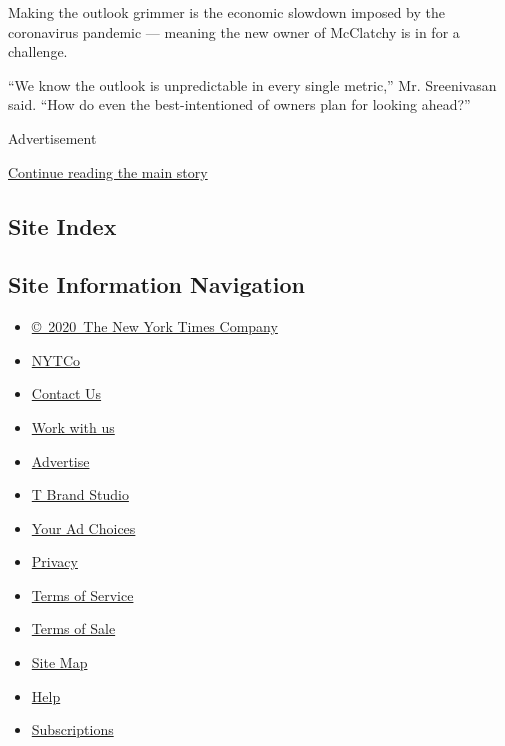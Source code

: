 Making the outlook grimmer is the economic slowdown imposed by the
coronavirus pandemic --- meaning the new owner of McClatchy is in for a
challenge.

``We know the outlook is unpredictable in every single metric,'' Mr.
Sreenivasan said. ``How do even the best-intentioned of owners plan for
looking ahead?''

Advertisement

\protect\hyperlink{after-bottom}{Continue reading the main story}

\hypertarget{site-index}{%
\subsection{Site Index}\label{site-index}}

\hypertarget{site-information-navigation}{%
\subsection{Site Information
Navigation}\label{site-information-navigation}}

\begin{itemize}
\tightlist
\item
  \href{https://help.nytimes.com/hc/en-us/articles/115014792127-Copyright-notice}{©~2020~The
  New York Times Company}
\end{itemize}

\begin{itemize}
\tightlist
\item
  \href{https://www.nytco.com/}{NYTCo}
\item
  \href{https://help.nytimes.com/hc/en-us/articles/115015385887-Contact-Us}{Contact
  Us}
\item
  \href{https://www.nytco.com/careers/}{Work with us}
\item
  \href{https://nytmediakit.com/}{Advertise}
\item
  \href{http://www.tbrandstudio.com/}{T Brand Studio}
\item
  \href{https://www.nytimes.com/privacy/cookie-policy\#how-do-i-manage-trackers}{Your
  Ad Choices}
\item
  \href{https://www.nytimes.com/privacy}{Privacy}
\item
  \href{https://help.nytimes.com/hc/en-us/articles/115014893428-Terms-of-service}{Terms
  of Service}
\item
  \href{https://help.nytimes.com/hc/en-us/articles/115014893968-Terms-of-sale}{Terms
  of Sale}
\item
  \href{https://spiderbites.nytimes.com}{Site Map}
\item
  \href{https://help.nytimes.com/hc/en-us}{Help}
\item
  \href{https://www.nytimes.com/subscription?campaignId=37WXW}{Subscriptions}
\end{itemize}
